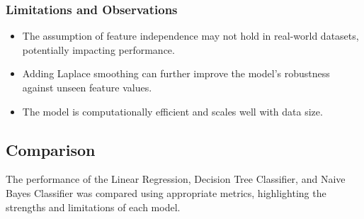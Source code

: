 \documentclass[12pt]{article}
\begin{document}
\subsubsection{Limitations and Observations}

\begin{itemize}
    \item The assumption of feature independence may not hold in real-world datasets, potentially impacting performance.
    \item Adding Laplace smoothing can further improve the model’s robustness against unseen feature values.
    \item The model is computationally efficient and scales well with data size.
\end{itemize}

\subsection{Comparison}

The performance of the Linear Regression, Decision Tree Classifier, and Naive Bayes Classifier was compared using appropriate metrics, highlighting the strengths and limitations of each model.
\end{document}
